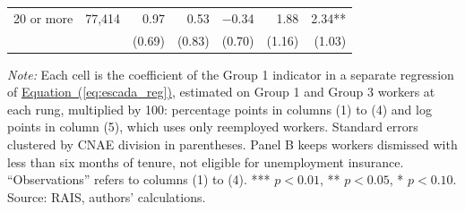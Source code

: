{\begin{threeparttable}
\begin{tabular}{lrrrrrr}
20 or more & 77,414 & 0.97 & 0.53 & $-$0.34 & 1.88 & 2.34** \\
 & & (0.69) & (0.83) & (0.70) & (1.16) & (1.03) \\
\bottomrule
\end{tabular}
\begin{tablenotes}[flushleft]\footnotesize
\item \textit{Note:} Each cell is the coefficient of the Group 1 indicator in a separate regression of \hyperref[eq:escada_reg]{Equation~(\ref*{eq:escada_reg})}, estimated on Group 1 and Group 3 workers at each rung, multiplied by 100: percentage points in columns (1) to (4) and log points in column (5), which uses only reemployed workers. Standard errors clustered by CNAE division in parentheses. Panel B keeps workers dismissed with less than six months of tenure, not eligible for unemployment insurance. ``Observations'' refers to columns (1) to (4). *** $p<0.01$, ** $p<0.05$, * $p<0.10$. Source: RAIS, authors' calculations.
\end{tablenotes}
\end{threeparttable}
}
